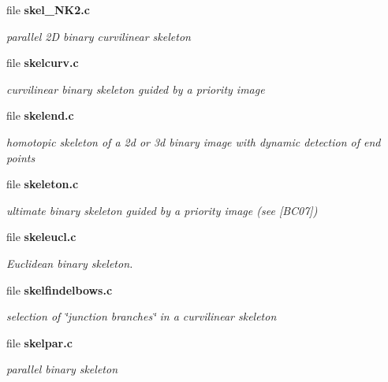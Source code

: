 \begin{CompactItemize}
\item 
file {\bf skel\_\-NK2.c}
\begin{CompactList}\small\item\em parallel 2D binary curvilinear skeleton \item\end{CompactList}

\item 
file {\bf skelcurv.c}
\begin{CompactList}\small\item\em curvilinear binary skeleton guided by a priority image \item\end{CompactList}

\item 
file {\bf skelend.c}
\begin{CompactList}\small\item\em homotopic skeleton of a 2d or 3d binary image with dynamic detection of end points \item\end{CompactList}

\item 
file {\bf skeleton.c}
\begin{CompactList}\small\item\em ultimate binary skeleton guided by a priority image (see [BC07]) \item\end{CompactList}

\item 
file {\bf skeleucl.c}
\begin{CompactList}\small\item\em Euclidean binary skeleton. \item\end{CompactList}

\item 
file {\bf skelfindelbows.c}
\begin{CompactList}\small\item\em selection of \char`\"{}junction branches\char`\"{} in a curvilinear skeleton \item\end{CompactList}

\item 
file {\bf skelpar.c}
\begin{CompactList}\small\item\em parallel binary skeleton \item\end{CompactList}


\end{CompactItemize}
